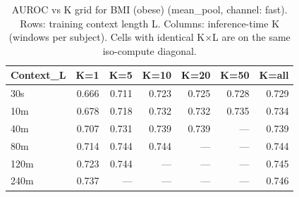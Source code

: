 \begin{table}[ht]
\centering
\caption{AUROC vs K grid for BMI (obese) (mean_pool, channel: fast). Rows: training context length L. Columns: inference-time K (windows per subject). Cells with identical K×L are on the same iso-compute diagonal.}
\label{tab:kgrid_bmi_binary_mean_pool_fast}
\begin{tabular}{lrrrrrr}
\toprule
Context_L & K=1 & K=5 & K=10 & K=20 & K=50 & K=all \\
\midrule
30s & 0.666 & 0.711 & 0.723 & 0.725 & 0.728 & 0.729 \\
10m & 0.678 & 0.718 & 0.732 & 0.732 & 0.735 & 0.734 \\
40m & 0.707 & 0.731 & 0.739 & 0.739 & — & 0.739 \\
80m & 0.714 & 0.744 & 0.744 & — & — & 0.744 \\
120m & 0.723 & 0.744 & — & — & — & 0.745 \\
240m & 0.737 & — & — & — & — & 0.746 \\
\bottomrule
\end{tabular}
\end{table}